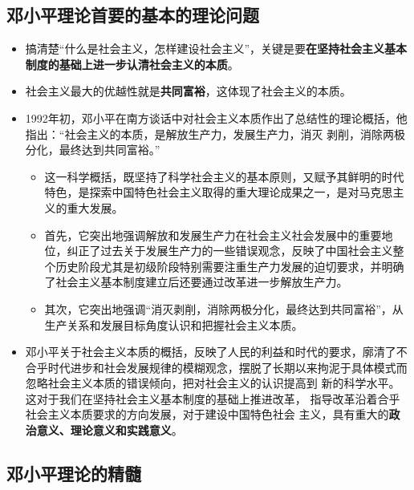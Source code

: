 \documentclass[12pt,openany]{ctexbook}
\begin{document}
\subsection{邓小平理论首要的基本的理论问题}
\begin{itemize}
  \item 搞清楚“什么是社会主义，怎样建设社会主义”，关键是要\textbf{在坚持社会主义基本制度的基础上进一步认清社会主义的本质}。
  \item 社会主义最大的优越性就是\textbf{共同富裕}，这体现了社会主义的本质。
  \item 1992年初，邓小平在南方谈话中对社会主义本质作出了总结性的理论概括，他指出：“社会主义的本质，是解放生产力，发展生产力，消灭 剥削，消除两极分化，最终达到共同富裕。”     
\begin{itemize}
  \item 这一科学概括，既坚持了科学社会主义的基本原则，又赋予其鲜明的时代特色，是探索中国特色社会主义取得的重大理论成果之一，是对马克思主义的重大发展。
  \item 首先，它突出地强调解放和发展生产力在社会主义社会发展中的重要地位，纠正了过去关于发展生产力的一些错误观念，反映了中国社会主义整个历史阶段尤其是初级阶段特别需要注重生产力发展的迫切要求，并明确了社会主义基本制度建立后还要通过改革进一步解放生产力。
  \item 其次，它突出地强调“消灭剥削，消除两极分化，最终达到共同富裕”，从生产关系和发展目标角度认识和把握社会主义本质。
\end{itemize}
  \item 邓小平关于社会主义本质的概括，反映了人民的利益和时代的要求，廓清了不合乎时代进步和社会发展规律的模糊观念，摆脱了长期以来拘泥于具体模式而忽略社会主义本质的错误倾向，把对社会主义的认识提高到 新的科学水平。这对于我们在坚持社会主义基本制度的基础上推进改革， 指导改革沿着合乎社会主义本质要求的方向发展，对于建设中国特色社会 主义，具有重大的\textbf{政治意义、理论意义和实践意义}。
\end{itemize}
\subsection{邓小平理论的精髓}
\end{document}
